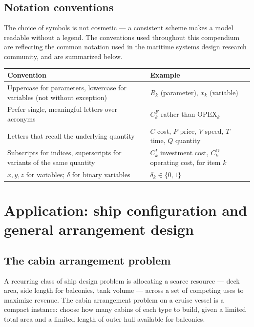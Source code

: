 \subsection{Notation conventions}

The choice of symbols is not cosmetic — a consistent scheme makes a model
readable without a legend. The conventions used throughout this
compendium are reflecting the common notation used in the maritime systems design research community, and are summarized below.

\begin{center}
\begin{tabular}{@{}p{}p{}@{}}
\toprule
Convention & Example \\
\midrule
Uppercase for parameters, lowercase for variables (not without exception) & $R_k$ (parameter), $x_k$ (variable) \\
Prefer single, meaningful letters over acronyms & $C_k^F$ rather than $\mathrm{OPEX}_k$ \\
Letters that recall the underlying quantity & $C$ cost, $P$ price, $V$ speed, $T$ time, $Q$ quantity \\
Subscripts for indices, superscripts for variants of the same quantity & $C_k^I$ investment cost, $C_k^O$ operating cost, for item $k$ \\
$x, y, z$ for variables; $\delta$ for binary variables & $\delta_k \in \{0,1\}$ \\
\bottomrule
\end{tabular}
\end{center}

\section{Application: ship configuration and general arrangement design}
\label{sec:cabin-problem}

\subsection{The cabin arrangement problem}

A recurring class of ship design problem is allocating a scarce resource
— deck area, side length for balconies, tank volume — across a set of
competing uses to maximize revenue. The cabin arrangement problem on a
cruise vessel is a compact instance: choose how many cabins of each type
to build, given a limited total area and a limited length of outer hull
available for balconies.

